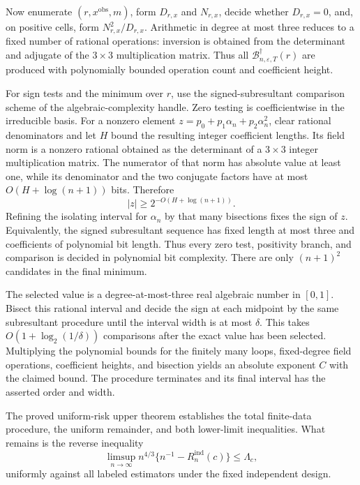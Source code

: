 Now enumerate \((r,x^{\mathrm{obs}},m)\), form \(D_{r,x}\) and \(N_{r,x}\), decide whether \(D_{r,x}=0\), and, on positive cells, form \(N_{r,x}^2/D_{r,x}\).  Arithmetic in degree at most three reduces to a fixed number of rational operations: inversion is obtained from the determinant and adjugate of the \(3\times3\) multiplication matrix.  Thus all \(\mathcal B_{n,\varepsilon,T}^\dagger(r)\) are produced with polynomially bounded operation count and coefficient height.

For sign tests and the minimum over \(r\), use the signed-subresultant comparison scheme of the algebraic-complexity handle.  Zero testing is coefficientwise in the irreducible basis.  For a nonzero element \(z=p_0+p_1\alpha_n+p_2\alpha_n^2\), clear rational denominators and let \(H\) bound the resulting integer coefficient lengths.  Its field norm is a nonzero rational obtained as the determinant of a \(3\times3\) integer multiplication matrix.  The numerator of that norm has absolute value at least one, while its denominator and the two conjugate factors have at most \(O(H+\log(n+1))\) bits.  Therefore
\[
|z|\ge2^{-O(H+\log(n+1))}.
\]
Refining the isolating interval for \(\alpha_n\) by that many bisections fixes the sign of \(z\).  Equivalently, the signed subresultant sequence has fixed length at most three and coefficients of polynomial bit length.  Thus every zero test, positivity branch, and comparison is decided in polynomial bit complexity.  There are only \((n+1)^2\) candidates in the final minimum.

The selected value is a degree-at-most-three real algebraic number in \([0,1]\).  Bisect this rational interval and decide the sign at each midpoint by the same subresultant procedure until the interval width is at most \(\delta\).  This takes
\(O(1+\log_2(1/\delta))\) comparisons after the exact value has been selected.  Multiplying the polynomial bounds for the finitely many loops, fixed-degree field operations, coefficient heights, and bisection yields an absolute exponent \(C\) with the claimed bound.  The procedure terminates and its final interval has the asserted order and width.

The proved uniform-risk upper theorem establishes the total finite-data procedure, the uniform remainder, and both lower-limit inequalities.  What remains is the reverse inequality
\[
\limsup_{n\to\infty}n^{4/3}\{n^{-1}-R_n^{\mathrm{ind}}(c)\}\le\Lambda_c,
\]
uniformly against all labeled estimators under the fixed independent design.


